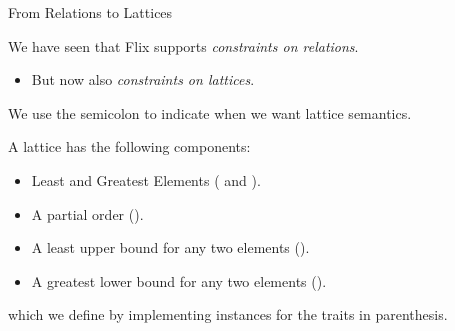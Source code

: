 \begin{frame}{From Relations to Lattices}

We have seen that Flix supports \emph{constraints on relations}. 

\begin{itemize}
    \item But now also \emph{constraints on lattices}.
\end{itemize}

We use the semicolon \Code{;} to indicate when we want lattice semantics.

\pause

A lattice has the following components:

\begin{itemize}
    \item Least and Greatest Elements ( and ).
    \item A partial order ().
    \item A least upper bound for any two elements ().
    \item A greatest lower bound for any two elements ().
\end{itemize}

which we define by implementing instances for the traits in parenthesis.

\end{frame}

